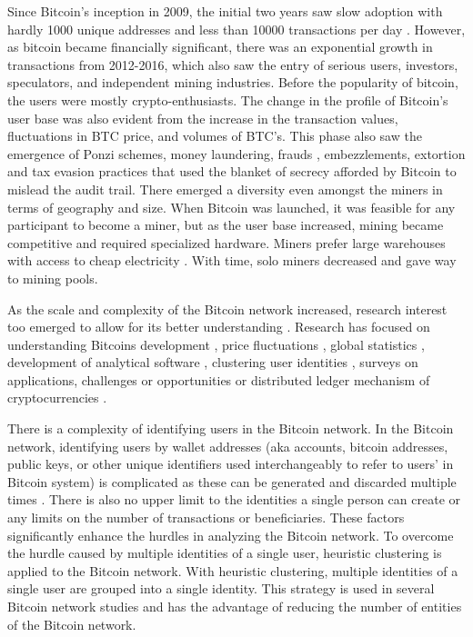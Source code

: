 \documentclass[num-refs]{wiley-article}
\begin{document}
Since Bitcoin's inception in 2009, the initial two years saw slow adoption with hardly 1000 unique addresses and less than 10000 transactions per day \cite{park2019nodes, GHOSH2020102635}. However, as bitcoin became financially significant, there was an exponential growth in transactions from 2012-2016, which also saw the entry of serious users, investors, speculators, and independent mining industries. Before the popularity of bitcoin, the users were mostly crypto-enthusiasts. The change in the profile of Bitcoin's user base was also evident from the increase in the transaction values, fluctuations in BTC price, and volumes of BTC's. This phase also saw the emergence of Ponzi schemes, money laundering, frauds \cite{bohme2015bitcoin}, embezzlements, extortion \cite{reyes2019method} and tax evasion \cite{toyoda2019novel} practices that used the blanket of secrecy afforded by Bitcoin to mislead the audit trail. There emerged a diversity even amongst the miners in terms of geography and size. When Bitcoin was launched, it was feasible for any participant to become a miner, but as the user base increased, mining became competitive and required specialized hardware. Miners prefer large warehouses with access to cheap electricity \cite{alqassem2018anti}. With time, solo miners decreased and gave way to mining pools. 



As the scale and complexity of the Bitcoin network increased, research interest too emerged to allow for its better understanding \cite{rahouti2018bitcoin, toyoda2019novel, alqassem2018anti, lee2019measurements, tschorsch2016bitcoin}. Research has focused on understanding Bitcoins development \cite{tschorsch2016bitcoin}, price fluctuations \cite{saad2019toward}, global statistics \cite{alqassem2018anti}, development of analytical software \cite{park2019nodes}, clustering user identities \cite{toyoda2019novel, pinna2018petri}, surveys on applications, challenges or opportunities \cite{monrat2019survey, yuan2018blockchain} or distributed ledger mechanism of cryptocurrencies \cite{lee2019measurements}. 


There is a complexity of identifying users in the Bitcoin network. In the Bitcoin network, identifying users by wallet addresses (aka accounts, bitcoin addresses, public keys, or other unique identifiers used interchangeably to refer to users' in Bitcoin system) is complicated as these can be generated and discarded multiple times \cite{alqassem2018anti}. There is also no upper limit to the identities a single person can create or any limits on the number of transactions or beneficiaries. These factors significantly enhance the hurdles in analyzing the Bitcoin network. To overcome the hurdle caused by multiple identities of a single user, heuristic clustering is applied to the Bitcoin network. With heuristic clustering, multiple identities of a single user are grouped into a single identity. This strategy is used in several Bitcoin network studies \cite{maesa2019bow, maesa2018graph, maesa2018data, maesa2016uncovering} and has the advantage of reducing the number of entities of the Bitcoin network. 
\end{document}
